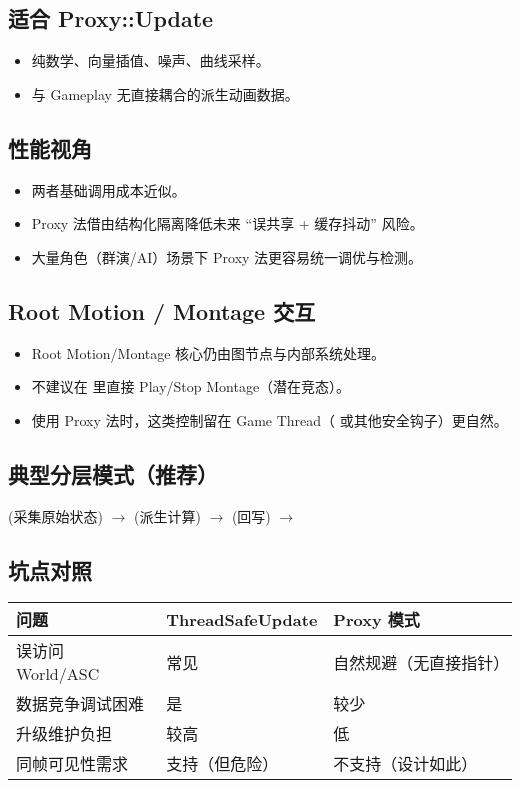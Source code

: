 \documentclass[10pt,openright,oneside,CJKmath]{MyBook}
\begin{document}
\subsection*{适合 Proxy::Update}
\begin{itemize}
  \item 纯数学、向量插值、噪声、曲线采样。
  \item 与 Gameplay 无直接耦合的派生动画数据。
\end{itemize}

\subsection{性能视角}
\begin{itemize}
  \item 两者基础调用成本近似。
  \item Proxy 法借由结构化隔离降低未来 “误共享 + 缓存抖动” 风险。
  \item 大量角色（群演/AI）场景下 Proxy 法更容易统一调优与检测。
\end{itemize}

\subsection{Root Motion / Montage 交互}
\begin{itemize}
  \item Root Motion/Montage 核心仍由图节点与内部系统处理。
  \item 不建议在  里直接 Play/Stop Montage（潜在竞态）。
  \item 使用 Proxy 法时，这类控制留在 Game Thread（ 或其他安全钩子）更自然。
\end{itemize}

\subsection{典型分层模式（推荐）}
\begin{marker}
 (采集原始状态) $\rightarrow$
 (派生计算) $\rightarrow $
 (回写) $\rightarrow$
\end{marker}
\subsection{坑点对照}
\begin{center}
\begin{tabular}{p{4cm} p{4.5cm} p{5.5cm}}
\hline
问题 & ThreadSafeUpdate & Proxy 模式 \\
\hline
误访问 World/ASC & 常见 & 自然规避（无直接指针） \\
数据竞争调试困难 & 是 & 较少 \\
升级维护负担 & 较高 & 低 \\
同帧可见性需求 & 支持（但危险） & 不支持（设计如此） \\
\hline
\end{tabular}
\end{center}
\end{document}
